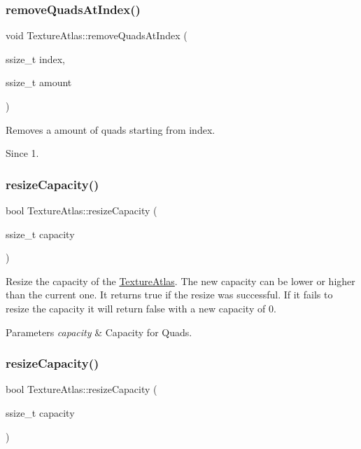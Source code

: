 \subsubsection{\texorpdfstring{remove\+Quads\+At\+Index()}{removeQuadsAtIndex()}\hspace{0.1cm}{\footnotesize\ttfamily [2/2]}}
{\footnotesize\ttfamily void Texture\+Atlas\+::remove\+Quads\+At\+Index (\begin{DoxyParamCaption}\item[{ssize\+\_\+t}]{index,  }\item[{ssize\+\_\+t}]{amount }\end{DoxyParamCaption})}

Removes a amount of quads starting from index. \begin{DoxySince}{Since}
1. 
\end{DoxySince}
\mbox{\label{classTextureAtlas_a2df218231fad90b00cbf5f7b8de2ecdf}} 
\subsubsection{\texorpdfstring{resize\+Capacity()}{resizeCapacity()}\hspace{0.1cm}{\footnotesize\ttfamily [1/2]}}
{\footnotesize\ttfamily bool Texture\+Atlas\+::resize\+Capacity (\begin{DoxyParamCaption}\item[{ssize\+\_\+t}]{capacity }\end{DoxyParamCaption})}

Resize the capacity of the \hyperlink{classTextureAtlas}{Texture\+Atlas}. The new capacity can be lower or higher than the current one. It returns true if the resize was successful. If it fails to resize the capacity it will return false with a new capacity of 0.


\begin{DoxyParams}{Parameters}
{\em capacity} & Capacity for Quads. \\
\hline
\end{DoxyParams}
\mbox{\label{classTextureAtlas_a2df218231fad90b00cbf5f7b8de2ecdf}} 
\subsubsection{\texorpdfstring{resize\+Capacity()}{resizeCapacity()}\hspace{0.1cm}{\footnotesize\ttfamily [2/2]}}
{\footnotesize\ttfamily bool Texture\+Atlas\+::resize\+Capacity (\begin{DoxyParamCaption}\item[{ssize\+\_\+t}]{capacity }\end{DoxyParamCaption})}

